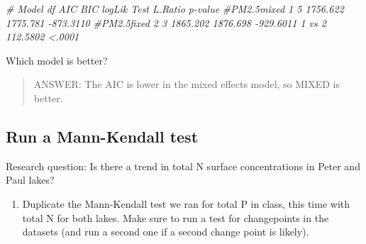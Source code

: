 \documentclass[]{article}
\newenvironment{Shaded}{\begin{snugshade}}{\end{snugshade}}
\newcommand{\KeywordTok}[1]{\textcolor[rgb]{0.13,0.29,0.53}{\textbf{#1}}}
\newcommand{\DataTypeTok}[1]{\textcolor[rgb]{0.13,0.29,0.53}{#1}}
\newcommand{\DecValTok}[1]{\textcolor[rgb]{0.00,0.00,0.81}{#1}}
\newcommand{\StringTok}[1]{\textcolor[rgb]{0.31,0.60,0.02}{#1}}
\newcommand{\CommentTok}[1]{\textcolor[rgb]{0.56,0.35,0.01}{\textit{#1}}}
\newcommand{\OperatorTok}[1]{\textcolor[rgb]{0.81,0.36,0.00}{\textbf{#1}}}
\newcommand{\NormalTok}[1]{#1}
\providecommand{\tightlist}{%
  \setlength{\itemsep}{0pt}\setlength{\parskip}{0pt}}
\begin{document}
\begin{Shaded}
\begin{Highlighting}[]
\CommentTok{#           Model df      AIC      BIC    logLik   Test  L.Ratio p-value}
\CommentTok{#PM2.5mixed     1  5 1756.622 1775.781 -873.3110                        }
\CommentTok{#PM2.5fixed     2  3 1865.202 1876.698 -929.6011 1 vs 2 112.5802  <.0001}
\end{Highlighting}
\end{Shaded}

Which model is better?

\begin{quote}
ANSWER: The AIC is lower in the mixed effects model, so MIXED is better.
\end{quote}

\subsection{Run a Mann-Kendall test}\label{run-a-mann-kendall-test}

Research question: Is there a trend in total N surface concentrations in
Peter and Paul lakes?

\begin{enumerate}
\def\labelenumi{\arabic{enumi}.}
\setcounter{enumi}{3}
\tightlist
\item
  Duplicate the Mann-Kendall test we ran for total P in class, this time
  with total N for both lakes. Make sure to run a test for changepoints
  in the datasets (and run a second one if a second change point is
  likely).
\end{enumerate}

\begin{Shaded}
\end{Shaded}
\end{document}
